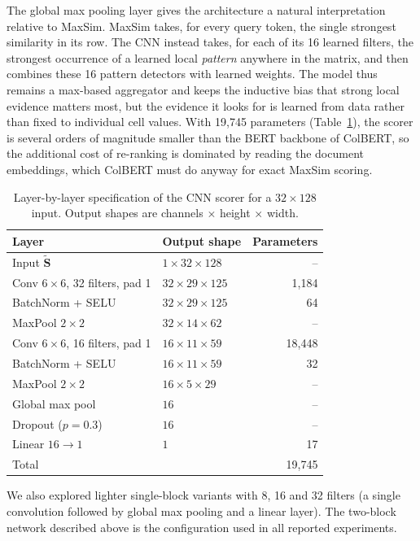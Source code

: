 \documentclass[preprint,5p,times,twocolumn,authoryear]{elsarticle}
\begin{document}
The global max pooling layer gives the architecture a natural interpretation relative to MaxSim. MaxSim takes, for every query token, the single strongest similarity in its row. The CNN instead takes, for each of its 16 learned filters, the strongest occurrence of a learned local \emph{pattern} anywhere in the matrix, and then combines these 16 pattern detectors with learned weights. The model thus remains a max-based aggregator and keeps the inductive bias that strong local evidence matters most, but the evidence it looks for is learned from data rather than fixed to individual cell values. With 19{,}745 parameters (Table~\ref{tab:cnn}), the scorer is several orders of magnitude smaller than the BERT backbone of ColBERT, so the additional cost of re-ranking is dominated by reading the document embeddings, which ColBERT must do anyway for exact MaxSim scoring.

\begin{table}[t]
\centering
\footnotesize
\caption{Layer-by-layer specification of the CNN scorer for a $32\times128$ input. Output shapes are channels $\times$ height $\times$ width.}
\label{tab:cnn}
\begin{tabular}{@{}llr@{}}
\toprule
Layer & Output shape & Parameters \\
\midrule
Input $\tilde{\mathbf{S}}$ & $1\times32\times128$ & -- \\
Conv $6\times6$, 32 filters, pad 1 & $32\times29\times125$ & 1{,}184 \\
BatchNorm + SELU & $32\times29\times125$ & 64 \\
MaxPool $2\times2$ & $32\times14\times62$ & -- \\
Conv $6\times6$, 16 filters, pad 1 & $16\times11\times59$ & 18{,}448 \\
BatchNorm + SELU & $16\times11\times59$ & 32 \\
MaxPool $2\times2$ & $16\times5\times29$ & -- \\
Global max pool & $16$ & -- \\
Dropout ($p=0.3$) & $16$ & -- \\
Linear $16\rightarrow1$ & $1$ & 17 \\
\midrule
Total & & 19{,}745 \\
\bottomrule
\end{tabular}
\end{table}

We also explored lighter single-block variants with 8, 16 and 32 filters (a single convolution followed by global max pooling and a linear layer). The two-block network described above is the configuration used in all reported experiments.
\end{document}
